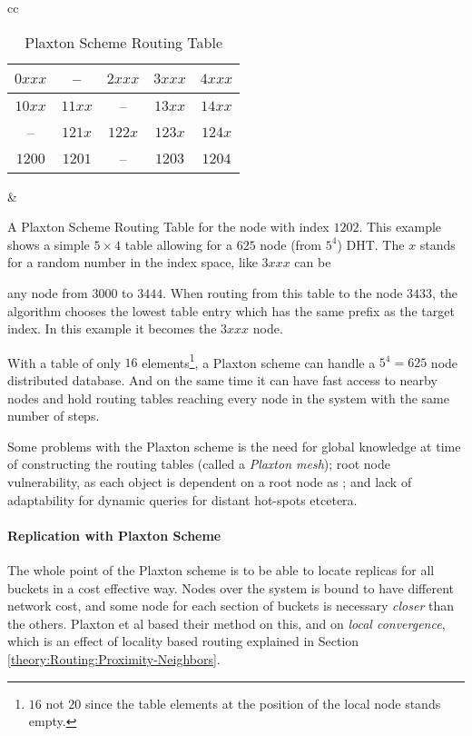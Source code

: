 \begin{table}[htp] %
\centering

\begin{tabular}{cc}
\begin{tabular}{||c|c|c|c|c||} \hline\hline
 $0xxx$ &   --   & $2xxx$ & $3xxx$ & $4xxx$ \\ \hline
 $10xx$ & $11xx$ &   --   & $13xx$ & $14xx$ \\ \hline
   --   & $121x$ & $122x$ & $123x$ & $124x$ \\ \hline
 $1200$ & $1201$ &   --   & $1203$ & $1204$ \\ \hline\hline
\end{tabular}

&

\parbox{.48\linewidth}{
  A Plaxton Scheme Routing
  Table\cite{plaxton-97-accessing-nearby} for the
  node with index $1202$. This example shows a simple
  $5\times{}4$ table allowing for a $625$ node (from
  $5^4$) DHT. The $x$ stands for a random number
  in the index space, like $3xxx$ can be
}
\vspace{.005\paperheight}
\end{tabular}

\parbox{.9\linewidth}{
  any node from $3000$ to $3444$.
  When routing from this table to the node $3433$, the algorithm chooses the lowest table
  entry which has the same prefix as the target index. In this example it becomes the
  $3xxx$ node.
}
\caption{Plaxton Scheme Routing Table}\label{tab:PlaxtonRouting}
\end{table}

With a table of only $16$ elements\footnote{$16$ not $20$ since the table elements
 at the position of the local node stands empty.}, a Plaxton scheme can handle a
 $5^4=625$ node distributed database. And on the same time it can have fast access
 to nearby nodes and hold routing tables reaching every node in the system with the
 same number of steps.

Some problems with the Plaxton scheme is the need for global knowledge at time of
 constructing the routing tables (called a \emph{Plaxton mesh}); root node vulnerability,
 as each object is dependent on a
 root node as ; and lack of adaptability for dynamic queries for distant
 hot-spots\cite{zhao-01-tapestry} etcetera.

\paragraph{Replication with Plaxton Scheme}
The whole point of the Plaxton scheme is to be able to locate replicas for all buckets
 in a cost effective way. Nodes over the system is bound to have different network cost,
 and some node for each section of buckets is necessary \emph{closer} than the others.
 Plaxton et al based their method on this, and on \emph{local convergence}, which is an
 effect of locality based routing explained in Section
 \ref{theory:Routing:Proximity-Neighbors}.


